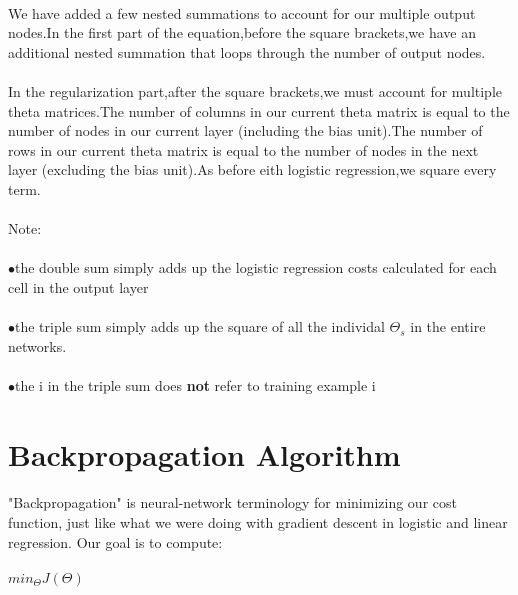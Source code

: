 \documentclass[UTF8]{ctexart}
\begin{document}
\paragraph{}
We have added a few nested summations to account for our multiple output nodes.In the first part of the equation,before the square brackets,we have an additional nested summation that loops through the number of output nodes.
\paragraph{}
In the regularization part,after the square brackets,we must account for multiple theta matrices.The number of columns in our current theta matrix is equal to the number of nodes in our current layer (including the bias unit).The number of rows in our current theta matrix is equal to the number of nodes in the next layer (excluding the bias unit).As before eith logistic regression,we square every term.
\paragraph{}
Note:
\paragraph{}
$\bullet$\quad the double sum simply adds up the logistic regression costs calculated for each cell in the output layer
\paragraph{}
$\bullet$\quad the triple sum simply adds up the square of all the individal $\Theta_{s}$ in the entire networks.
\paragraph{}
$\bullet$\quad the i in the triple sum does \textbf{not} refer to training example i
\newpage
\section{Backpropagation Algorithm}
\paragraph{}
"Backpropagation" is neural-network terminology for minimizing our cost function, just like what we were doing with gradient descent in logistic and linear regression. Our goal is to compute:
\paragraph{}
$min_{\Theta}J(\Theta)$
\end{document}
